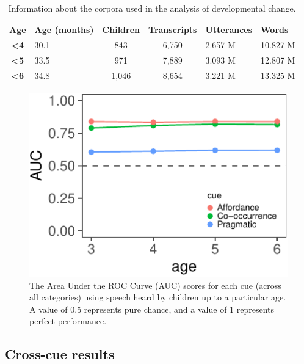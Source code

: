 \documentclass[english,,man,floatsintext]{apa6}
\begin{document}
\begin{table}[!htbp] \centering 
\begin{tabularx}{\linewidth}{cXccXX}

\textbf{Age} & Age (months) & Children & Transcripts & Utterances & Words \\
\hline

\textbf{\textless4} & 30.1 & 843 & 6,750 & 2.657 M & 10.827 M\\

\textbf{\textless5} & 33.5 & 971 & 7,889 & 3.093 M & 12.807 M\\

\textbf{\textless6} & 34.8 & 1,046 & 8,654 & 3.221 M & 13.325 M\\

\hline
\end{tabularx}
\caption{\label{tab:development} Information about the corpora used in the analysis of developmental change.}
\end{table}

\begin{figure}[!htbp]

{\centering \includegraphics{cogsci_journal_files/figure-latex/dev-1} 

}

\caption{\label{fig:dev} The Area Under the ROC Curve (AUC) scores for each cue (across all categories) using speech heard by children up to a particular age. A value of 0.5 represents pure chance, and a value of 1 represents perfect performance.}\label{fig:dev}
\end{figure}

\hypertarget{cross-cue-results}{%
\subsection{Cross-cue results}\label{cross-cue-results}}
\end{document}
